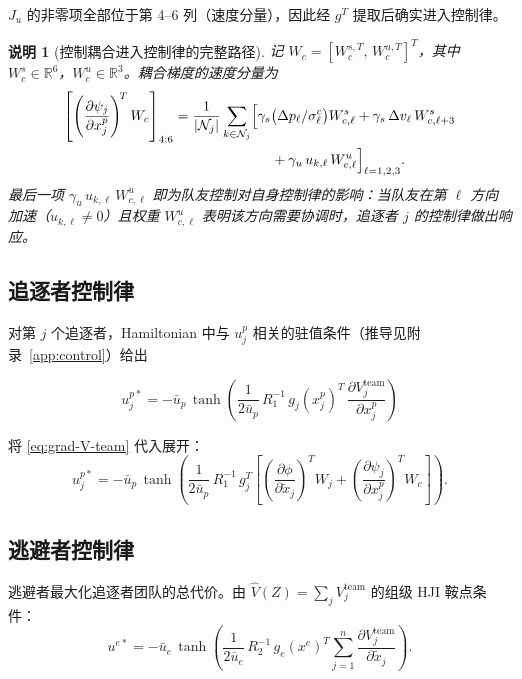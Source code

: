 \documentclass[12pt,a4paper]{ctexart}
\newtheorem{remark}[theorem]{说明}
\begin{document}
$J_u$ 的非零项全部位于第 4--6 列（速度分量），因此经 $g^T$ 提取后确实进入控制律。

\begin{remark}[控制耦合进入控制律的完整路径]\label{rmk:control-path}
记 $W_c = [W_c^{s,T},\, W_c^{u,T}]^T$，其中 $W_c^s \in \mathbb{R}^6$，$W_c^u \in \mathbb{R}^3$。耦合梯度的速度分量为
\begin{align*}
\left[\left(\frac{\partial \psi_j}{\partial x_j^p}\right)^{\!T} W_c\right]_{4:6}
&= \frac{1}{|\mathcal{N}_j|} \sum_{k \in \mathcal{N}_j} \Bigl[
\gamma_s\bigl(\Delta p_\ell / \sigma_\ell^c\bigr) W_{c,\ell}^s
+ \gamma_s\,\Delta v_\ell\, W_{c,\ell+3}^s \\
&\qquad\qquad\qquad\quad + \gamma_u\, u_{k,\ell}\, W_{c,\ell}^u
\Bigr]_{\ell=1,2,3}.
\end{align*}
最后一项 $\gamma_u\, u_{k,\ell}\, W_{c,\ell}^u$ 即为队友控制对自身控制律的影响：当队友在第 $\ell$ 方向加速（$u_{k,\ell} \neq 0$）且权重 $W_{c,\ell}^u$ 表明该方向需要协调时，追逐者 $j$ 的控制律做出响应。
\end{remark}

\subsection{追逐者控制律}

对第 $j$ 个追逐者，Hamiltonian 中与 $u_j^p$ 相关的驻值条件（推导见附录~\ref{app:control}）给出

\begin{equation}\label{eq:team-up}
\boxed{
u_j^{p*} = -\bar{u}_p\,\tanh\!\left(\frac{1}{2\bar{u}_p}\,R_1^{-1}\,g_j(x_j^p)^T\,
\frac{\partial V_j^{\mathrm{team}}}{\partial x_j^p}\right)
}
\end{equation}

将 \eqref{eq:grad-V-team} 代入展开：
\begin{equation}\label{eq:team-up-expanded}
u_j^{p*} = -\bar{u}_p\,\tanh\!\left(\frac{1}{2\bar{u}_p}\,R_1^{-1}\,g_j^T \left[
\left(\frac{\partial \phi}{\partial \tilde{x}_j}\right)^{\!T} W_j
+ \left(\frac{\partial \psi_j}{\partial x_j^p}\right)^{\!T} W_c
\right]\right).
\end{equation}

\subsection{逃避者控制律}

逃避者最大化追逐者团队的总代价。由 $\hat{V}(Z) = \sum_j V_j^{\mathrm{team}}$ 的组级 HJI 鞍点条件：
\begin{equation}\label{eq:team-ue}
u^{e*} = -\bar{u}_e\,\tanh\!\left(\frac{1}{2\bar{u}_e}\,R_2^{-1}\,g_e(x^e)^T \sum_{j=1}^{n} \frac{\partial V_j^{\mathrm{team}}}{\partial \tilde{x}_j}\right).
\end{equation}
\end{document}
